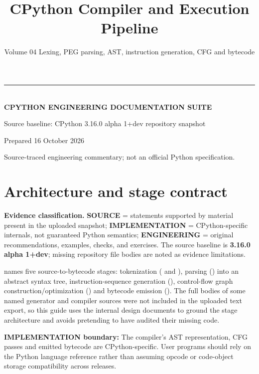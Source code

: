 \documentclass[
  11pt,
]{report}
\title{CPython Compiler and Execution Pipeline}
\subtitle{Volume 04 \textbar{} Lexing, PEG parsing, AST, instruction
generation, CFG and bytecode}
\author{}
\date{}
\makeatletter
\renewcommand{\maketitle}{%
  \hypersetup{pageanchor=false}%
\begin{titlepage}\pagecolor{CPNavy}\color{white}\sffamily
  \vspace*{0.8in}
  {\color{CPGold}\rule{2.1in}{4pt}}\\[16pt]
  {\Large\bfseries CPYTHON ENGINEERING DOCUMENTATION SUITE}\\[24pt]
  {\Huge\bfseries \@title\par}\vspace{19pt}
  \vfill
  {\normalsize Source baseline: CPython 3.16.0 alpha 1+dev repository snapshot}\par
  {\normalsize Prepared 16 October 2026}\par
  {\small\color{white!70} Source-traced engineering commentary; not an official Python specification.}\vspace{0.65in}
  \end{titlepage}\hypersetup{pageanchor=true}\nopagecolor\color{black}
  }
\makeatother
\begin{document}
\maketitle

{
\setcounter{tocdepth}{1}
\tableofcontents
}
\chapter{Architecture and stage
contract}\label{architecture-and-stage-contract}

\begin{sourcebox}
\textbf{Evidence classification.} \textbf{SOURCE} = statements supported by material present in the uploaded snapshot; \textbf{IMPLEMENTATION} = CPython-specific internals, not guaranteed Python semantics; \textbf{ENGINEERING} = original recommendations, examples, checks, and exercises. The source baseline is \textbf{3.16.0 alpha 1+dev}; missing repository file bodies are noted as evidence limitations.
\end{sourcebox}

 names five
source-to-bytecode stages: tokenization
( and
), parsing
() into an abstract syntax
tree, instruction-sequence generation
(), control-flow graph
construction/optimization ()
and bytecode emission (). The
full bodies of some named generator and compiler sources were not
included in the uploaded text export, so this guide uses the internal
design documents to ground the stage architecture and avoids pretending
to have audited their missing code.

\textbf{IMPLEMENTATION boundary:} The compiler's AST representation, CFG
passes and emitted bytecode are CPython-specific. User programs should
rely on the Python language reference rather than assuming opcode or
code-object storage compatibility across releases.
\end{document}
